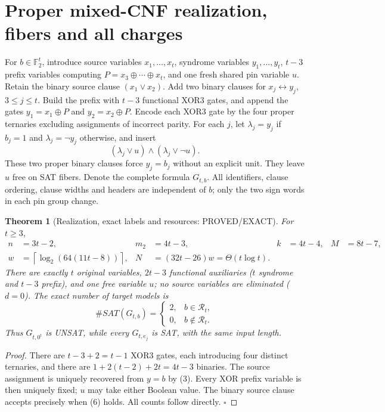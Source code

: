 \documentclass[11pt]{article}
\newtheorem{theorem}{Theorem}
\begin{document}
\section{Proper mixed-CNF realization, fibers and all charges}
For \(b\in\mathbb F_2^t\), introduce source variables \(x_1,\dots,x_t\),
syndrome variables \(y_1,\dots,y_t\), \(t-3\) prefix variables computing
\(P=x_3\oplus\cdots\oplus x_t\), and one fresh shared pin variable \(u\).
Retain the binary source clause \((x_1\lor x_2)\). Add two binary clauses
for \(x_j\leftrightarrow y_j\), \(3\le j\le t\). Build the prefix with
\(t-3\) functional XOR3 gates, and append the gates
\(y_1=x_1\oplus P\) and \(y_2=x_2\oplus P\). Encode each XOR3 gate by the
four proper ternaries excluding assignments of incorrect parity. For each
\(j\), let \(\lambda_j=y_j\) if \(b_j=1\) and \(\lambda_j=\neg y_j\) otherwise, and insert
\[
(\lambda_j\lor u)\land(\lambda_j\lor\neg u).  \tag{8}
\]
These two proper binary clauses force \(y_j=b_j\) without an explicit unit.
They leave \(u\) free on SAT fibers. Denote the complete formula \(G_{t,b}\).
All identifiers, clause ordering, clause widths and headers are independent
of \(b\); only the two sign words in each pin group change.

\begin{theorem}[Realization, exact labels and resources: PROVED/EXACT]
For \(t\ge3\),
\[
\begin{aligned}
n&=3t-2, &m_2&=4t-3,&k&=4t-4,&M&=8t-7,\\
w&=\left\lceil\log_2(64(11t-8))\right\rceil,&
N&=(32t-26)w=\Theta(t\log t).
\end{aligned}                                                  \tag{9}
\]
There are exactly \(t\) original variables, \(2t-3\) functional
auxiliaries (\(t\) syndrome and \(t-3\) prefix), and one free variable \(u\);
no source variables are eliminated (\(d=0\)). The exact number of target models is
\[
\#SAT(G_{t,b})=
\begin{cases}2,& b\in\mathcal R_t,\\0,&b\notin\mathcal R_t.\end{cases}         \tag{10}
\]
Thus \(G_{t,0^t}\) is UNSAT, while every \(G_{t,e_j}\) is SAT, with the same input length.
\end{theorem}
\begin{proof}
There are \(t-3+2=t-1\) XOR3 gates, each introducing four distinct
ternaries, and there are \(1+2(t-2)+2t=4t-3\) binaries.
The source assignment is uniquely recovered from \(y=b\) by (3).
Every XOR prefix variable is then uniquely fixed; \(u\) may take either
Boolean value. The binary source clause accepts precisely when (6) holds.
All counts follow directly. \(\square\)
\end{proof}
\end{document}
